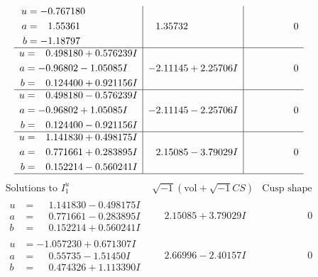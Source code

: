 \documentclass[1p]{elsarticle_modified}
\theoremstyle{definition}
\newcommand{\I}{\sqrt{-1}}
\begin{document}
$$\begin{array}{c|c|c}
\begin{aligned}
u &= -0.767180\phantom{ +0.000000I} \\
a &= \phantom{-}1.55361\phantom{ +0.000000I} \\
b &= -1.18797\phantom{ +0.000000I}\end{aligned}
 & \phantom{-}1.35732\phantom{ +0.000000I} & \phantom{-0.000000 } 0 \\ \hline\begin{aligned}
u &= \phantom{-}0.498180 + 0.576239 I \\
a &= -0.96802 - 1.05085 I \\
b &= \phantom{-}0.124400 + 0.921156 I\end{aligned}
 & -2.11145 + 2.25706 I & \phantom{-0.000000 } 0 \\ \hline\begin{aligned}
u &= \phantom{-}0.498180 - 0.576239 I \\
a &= -0.96802 + 1.05085 I \\
b &= \phantom{-}0.124400 - 0.921156 I\end{aligned}
 & -2.11145 - 2.25706 I & \phantom{-0.000000 } 0 \\ \hline\begin{aligned}
u &= \phantom{-}1.141830 + 0.498175 I \\
a &= \phantom{-}0.771661 + 0.283895 I \\
b &= \phantom{-}0.152214 - 0.560241 I\end{aligned}
 & \phantom{-}2.15085 - 3.79029 I & \phantom{-0.000000 } 0\\
 \hline 
 \end{array}$$\newpage$$\begin{array}{c|c|c}  
\text{Solutions to }I^u_{1}& \I (\text{vol} + \sqrt{-1}CS) & \text{Cusp shape}\\
 \hline 
\begin{aligned}
u &= \phantom{-}1.141830 - 0.498175 I \\
a &= \phantom{-}0.771661 - 0.283895 I \\
b &= \phantom{-}0.152214 + 0.560241 I\end{aligned}
 & \phantom{-}2.15085 + 3.79029 I & \phantom{-0.000000 } 0 \\ \hline\begin{aligned}
u &= -1.057230 + 0.671307 I \\
a &= \phantom{-}0.55735 - 1.51450 I \\
b &= \phantom{-}0.474326 + 1.113390 I\end{aligned}
 & \phantom{-}2.66996 - 2.40157 I & \phantom{-0.000000 } 0 \\ \hline\begin{aligned}

\end{aligned}
\end{array}$$
\end{document}
